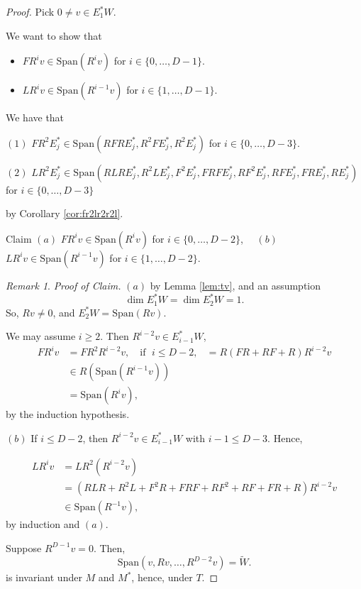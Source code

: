 \documentclass[
]{book}
\providecommand{\tightlist}{%
  \setlength{\itemsep}{0pt}\setlength{\parskip}{0pt}}
\theoremstyle{definition}
\theoremstyle{definition}
\theoremstyle{definition}
\theoremstyle{definition}
\theoremstyle{remark}
\newtheorem*{remark}{Remark}
\begin{document}
\begin{proof}
Pick \(0\neq v\in E^*_1W\).

We want to show that

\begin{itemize}
\tightlist
\item
  \(FR^iv \in \mathrm{Span}(R^iv)\) for \(i\in \{0, \ldots, D-1\}\).
\item
  \(LR^iv \in \mathrm{Span}(R^{i-1}v)\) for \(i\in \{1, \ldots, D-1\}\).
\end{itemize}

We have that

\((1)\) \(FR^2E^*_j \in \mathrm{Span}(RFRE^*_j, R^2FE^*_j, R^2E^*_j)\) for \(i\in \{0, \ldots, D-3\}\).

\((2)\) \(LR^2E^*_j \in \mathrm{Span}(RLRE^*_j, R^2LE^*_j, F^2E^*_j, FRFE^*_j, RF^2E^*_j, RFE^*_j, FRE^*_j, RE^*_j)\) for \(i\in \{0, \ldots, D-3\}\)

by Corollary \ref{cor:fr2lr2r2l}.

Claim \((a)\) \(FR^iv \in \mathrm{Span}(R^iv)\) for \(i\in \{0, \ldots, D-2\}\),
\(\quad (b)\) \(LR^iv \in \mathrm{Span}(R^{i-1}v)\) for \(i\in \{1, \ldots, D-2\}\).

\begin{remark}
\emph{Proof of Claim.}
\textbar{} \((a)\) by Lemma \ref{lem:tv}, and an assumption
\[\dim E^*_1W = \dim E^*_2W = 1.\]
So, \(Rv\neq 0\), and \(E^*_2W = \mathrm{Span}(Rv)\).

We may assume \(i\geq 2\). Then \(R^{i-2}v \in E^*_{i-1}W\),
\begin{align}
FR^iv & = FR^2R^{i-2}v, \quad \text{if }\; i\leq D-2,
& = R(FR + RF + R)R^{i-2}v\\
& \in R(\mathrm{Span}(R^{i-1}v)) \\
& = \mathrm{Span}(R^iv),
\end{align}
by the induction hypothesis.

\((b)\) If \(i\leq D-2\), then \(R^{i-2}v\in E^*_{i-1}W\) with \(i-1\leq D-3\). Hence,

\begin{align}
LR^iv &= LR^2(R^{i-2}v)\\
& = (RLR + R^2L + F^2R + FRF + RF^2 + RF + FR + R)R^{i-2}v\\
& \in \mathrm{Span}(R^{-1}v),
\end{align}
by induction and \((a)\).
\end{remark}

Suppose \(R^{D-1}v = 0\). Then,
\[\mathrm{Span}(v, Rv, \ldots, R^{D-2}v) = \widetilde{W}.\]
is invariant under \(M\) and \(M^*\), hence, under \(T\).


\end{proof}
\end{document}
